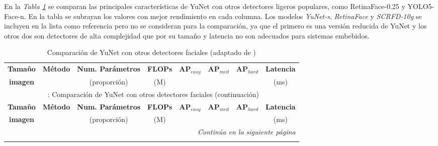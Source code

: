 En la \textit{Tabla \ref{tab:yunet_comparison}} se comparan las principales características de YuNet con otros detectores ligeros populares, como RetinaFace-0.25 y YOLO5-Face-n. En la tabla se subrayan los valores con mejor rendimiento en cada columna. Los modelos \textit{YuNet-s}, \textit{RetinaFace} y \textit{SCRFD-10g} se incluyen en la lista como referencia pero no se consideran para la comparación, ya que el primero es una versión reducida de YuNet y los otros dos son detectores de alta complejidad que por su tamaño y latencia no son adecuados para sistemas embebidos.

\begin{scriptsize}
    
    \begin{longtable}{c|l|r|r|c|c|c|c}
        \caption{Comparación de YuNet con otros detectores faciales (adaptado de \cite{wu_yunet_2023})}
        \label{tab:yunet_comparison} \\
        \hline
        \multicolumn{1}{c|}{\textbf{Tamaño}} &
        \multicolumn{1}{c|}{\textbf{Método}} &
        \multicolumn{1}{c|}{\textbf{Num. Parámetros}} &
        \multicolumn{1}{c|}{\textbf{FLOPs}} &
        \multicolumn{1}{c|}{\textbf{AP$_{easy}$}} &
        \multicolumn{1}{c|}{\textbf{AP$_{med}$}} &
        \multicolumn{1}{c|}{\textbf{AP$_{hard}$}} &
        \multicolumn{1}{c}{\textbf{Latencia}}\\
        \multicolumn{1}{c|}{\textbf{imagen}} &
        & \multicolumn{1}{c|}{(proporción)} &
        \multicolumn{1}{c|}{(M)} &
        & & & \multicolumn{1}{c}{(ms)}\\
        \hline
        \endfirsthead
        
        \multicolumn{8}{c}{\tablename\ \thetable{}: Comparación de YuNet con otros detectores faciales (continuación)}\\
    \hline
    \multicolumn{1}{c|}{\textbf{Tamaño}} &
    \multicolumn{1}{c|}{\textbf{Método}} &
    \multicolumn{1}{c|}{\textbf{Num. Parámetros}} &
    \multicolumn{1}{c|}{\textbf{FLOPs}} &
    \multicolumn{1}{c|}{\textbf{AP$_{easy}$}} &
    \multicolumn{1}{c|}{\textbf{AP$_{med}$}} &
    \multicolumn{1}{c|}{\textbf{AP$_{hard}$}} &
    \multicolumn{1}{c}{\textbf{Latencia}}\\
    \multicolumn{1}{c|}{\textbf{imagen}} &
    & \multicolumn{1}{c|}{(proporción)} &
    \multicolumn{1}{c|}{(M)} &
    & & & \multicolumn{1}{c}{(ms)}\\
    \hline
    \endhead
    
    \hline
    \multicolumn{8}{r}{\textit{Continúa en la siguiente página}}\\
    \endfoot
    

\end{longtable}
\end{scriptsize}
